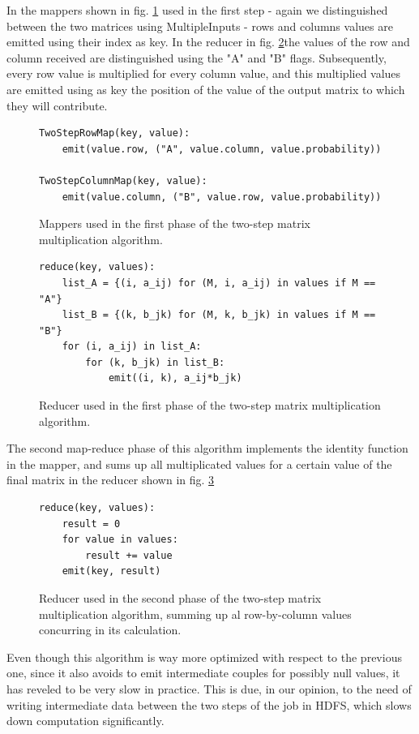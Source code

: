 In the mappers shown in fig. \ref{fig:twoStep1Map} used in the first step - again we distinguished between the two matrices using MultipleInputs - rows and columns values are emitted using their index as key.
In the reducer in fig. \ref{fig:twoStep1Reducer}the values of the row and column received are distinguished using the "A" and "B" flags. Subsequently,
every row value is multiplied for every column value, and this multiplied values are emitted using as key
the position of the value of the output matrix to which they will contribute. %
\begin{figure}
\begin{verbatim}
TwoStepRowMap(key, value):
    emit(value.row, ("A", value.column, value.probability))

TwoStepColumnMap(key, value):
    emit(value.column, ("B", value.row, value.probability))
\end{verbatim}
\caption{Mappers used in the first phase of the two-step matrix multiplication algorithm.}
\label{fig:twoStep1Map}
\end{figure}
\begin{figure}
\begin{verbatim}
reduce(key, values):
    list_A = {(i, a_ij) for (M, i, a_ij) in values if M == "A"}
    list_B = {(k, b_jk) for (M, k, b_jk) in values if M == "B"}
    for (i, a_ij) in list_A:
        for (k, b_jk) in list_B:
            emit((i, k), a_ij*b_jk)
\end{verbatim}
\caption{Reducer used in the first phase of the two-step matrix multiplication algorithm.}
\label{fig:twoStep1Reducer}
\end{figure}

The second map-reduce phase of this algorithm implements the identity function in the mapper, and sums up all
multiplicated values for a certain value of the final matrix in the reducer shown in fig. \ref{fig:twoStep2Reducer}

\begin{figure}
\begin{verbatim}
reduce(key, values):
    result = 0
    for value in values:
        result += value
    emit(key, result)
\end{verbatim}
\caption{Reducer used in the second phase of the two-step matrix multiplication algorithm, summing up al row-by-column values concurring in its calculation.}
\label{fig:twoStep2Reducer}
\end{figure}
Even though this algorithm is way more optimized with respect to the previous one, since it also avoids to emit intermediate couples for possibly null values, it has reveled to be very slow in practice. This is due, in our opinion, to the need
of writing intermediate data between the two steps of the job in HDFS, which slows down computation significantly.


